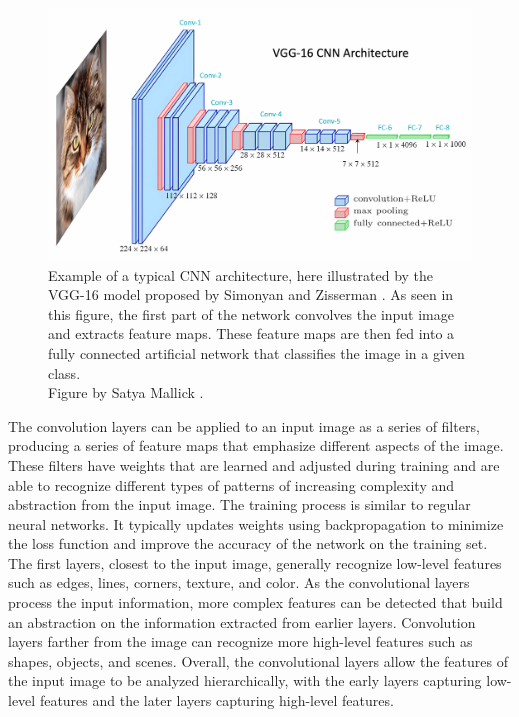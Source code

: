     \begin{figure}[htb]
        \centerline{
        \includegraphics[width=1.1\linewidth]{images/vgg_cnn.png}}
        \caption[Example of a CNN architecture, illustrated by the VGG-16.]{Example of a typical CNN architecture, here illustrated by the VGG-16 model proposed by Simonyan and Zisserman \cite{simonyanVeryDeepConvolutional2015}. As seen in this figure, the first part of the network convolves the input image and extracts feature maps. These feature maps are then fed into a fully connected artificial network that classifies the image in a given class.\\
        Figure by Satya Mallick \cite{UnderstandingConvolutionalNeural2023}.}
        \label{fig:vgg_cnn}
    \end{figure}
    
    The convolution layers can be applied to an input image as a series of filters, producing a series of feature maps that emphasize different aspects of the image. These filters have weights that are learned and adjusted during training and are able to recognize different types of patterns of increasing complexity and abstraction from the input image. The training process is similar to regular neural networks. It typically updates weights using backpropagation to minimize the loss function and improve the accuracy of the network on the training set. The first layers, closest to the input image, generally recognize low-level features such as edges, lines, corners, texture, and color. As the convolutional layers process the input information, more complex features can be detected that build an abstraction on the information extracted from earlier layers. Convolution layers farther from the image can recognize more high-level features such as shapes, objects, and scenes. Overall, the convolutional layers allow the features of the input image to be analyzed hierarchically, with the early layers capturing low-level features and the later layers capturing high-level features.
    
